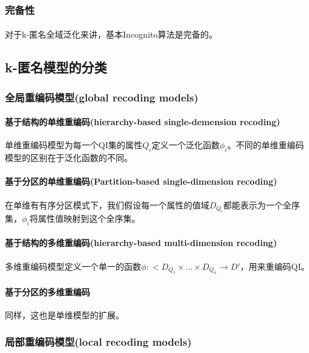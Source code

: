 \documentclass[12pt,a4paper]{article}
\begin{document}
\subsubsection{完备性}
\paragraph{} 对于k-匿名全域泛化来讲，基本Incognito算法是完备的。

\subsection{k-匿名模型的分类}
\subsubsection{全局重编码模型(global recoding models)}

\paragraph{基于结构的单维重编码(hierarchy-based single-demension recoding)} 单维重编码模型为每一个QI集的属性$Q_i$定义一个泛化函数$\phi_i$。不同的单维重编码模型的区别在于泛化函数的不同。

\paragraph{基于分区的单维重编码(Partition-based single-dimension recoding)} 在单维有有序分区模式下，我们假设每一个属性的值域$D_{Q_i}$都能表示为一个全序集，$\phi_i$将属性值映射到这个全序集。

\paragraph{基于结构的多维重编码(hierarchy-based multi-dimension recoding)} 多维重编码模型定义一个单一的函数$\phi: <D_{Q_1} \times ... \times D_{Q_n} \rightarrow D'$，用来重编码QI。

\paragraph{基于分区的多维重编码} 同样，这也是单维模型的扩展。


\subsubsection{局部重编码模型(local recoding models)}
\end{document}
